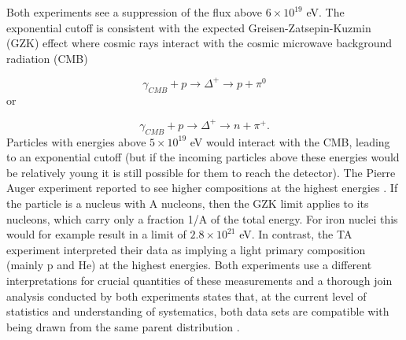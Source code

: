Both experiments see a suppression of the flux above $6 \times 10^{19}$ eV. The exponential cutoff is consistent with the expected Greisen-Zatsepin-Kuzmin (GZK) effect \cite{Greisen:1966jv,Zatsepin:1966jv} where cosmic rays interact with the cosmic microwave background radiation (CMB)

\begin{equation}
\gamma_{CMB} + p \rightarrow \Delta^+ \rightarrow p + \pi^0
\end{equation} 
or

\begin{equation}
\gamma_{CMB} + p \rightarrow \Delta^+ \rightarrow n + \pi^+.
\end{equation}
Particles with energies above $5 \times 10^{19}$ eV would interact with the CMB, leading to an exponential cutoff (but if the incoming particles above these energies would be relatively young it is still possible for them to reach the detector). The Pierre Auger experiment reported to see higher compositions at the highest energies \cite{icrc2017:pa}. If the particle is a nucleus with A nucleons, then the GZK limit applies to its nucleons, which carry only a fraction 1/A of the total energy. For iron nuclei this would for example result in a limit of $2.8 \times 10^{21}$ eV. In contrast, the TA experiment interpreted their data as implying a light primary composition (mainly p and He) at the highest energies. Both experiments use a different interpretations for crucial quantities of these measurements and a thorough join analysis conducted by both experiments states that, at the current level of statistics and understanding of systematics, both data sets are compatible with being drawn from the same parent distribution \cite{PDG2018url}.


